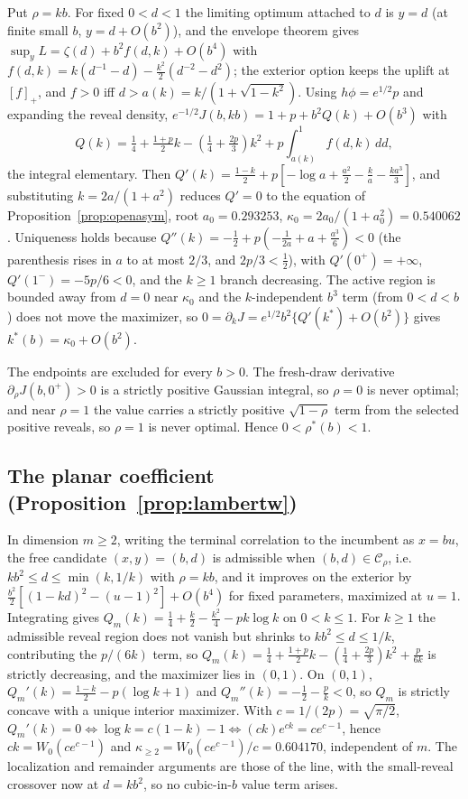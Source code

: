 \documentclass[11pt]{article}
\theoremstyle{itheads}
\begin{document}
Put $\rho=kb$. For fixed $0<d<1$ the limiting optimum attached to $d$
is $y=d$ (at finite small $b$, $y=d+O(b^{2})$), and the envelope theorem
gives
$\sup_y L=\zeta(d)+b^{2}f(d,k)+O(b^{4})$ with
$f(d,k)=k(d^{-1}-d)-\tfrac{k^{2}}{2}(d^{-2}-d^{2})$; the exterior option
keeps the uplift at $[f]_+$, and $f>0$ iff $d>a(k)=k/(1+\sqrt{1-k^{2}})$.
Using $h\phi=e^{1/2}p$ and expanding the reveal density,
$e^{-1/2}J(b,kb)=1+p+b^{2}Q(k)+O(b^{3})$ with
\begin{equation}
Q(k)=\tfrac14+\tfrac{1+p}{2}k-\left(\tfrac14+\tfrac{2p}{3}\right)k^{2}
+p\!\int_{a(k)}^{1}\!f(d,k)\,dd,
\end{equation}
the integral elementary. Then
$Q'(k)=\tfrac{1-k}{2}+p[-\log a+\tfrac{a^{2}}{2}-\tfrac{k}{a}
-\tfrac{ka^{3}}{3}]$, and substituting $k=2a/(1+a^{2})$ reduces $Q'=0$
to the equation of Proposition~\ref{prop:openasym}, root
$a_0=0.293253$, $\kappa_0=2a_0/(1+a_0^{2})=0.540062$. Uniqueness holds
because $Q''(k)=-\tfrac12+p(-\tfrac1{2a}+a+\tfrac{a^{3}}{6})<0$ (the
parenthesis rises in $a$ to at most $2/3$, and $2p/3<\tfrac12$), with
$Q'(0^{+})=+\infty$, $Q'(1^{-})=-5p/6<0$, and the $k\ge1$ branch
decreasing. The active region is bounded away from $d=0$ near
$\kappa_0$ and the $k$-independent $b^{3}$ term (from $0<d<b$) does not
move the maximizer, so $0=\partial_k J=e^{1/2}b^{2}\{Q'(k^{*})+O(b^{2})\}$
gives $k^{*}(b)=\kappa_0+O(b^{2})$.

The endpoints are excluded for every $b>0$. The fresh-draw derivative
$\partial_\rho J(b,0^{+})>0$ is a strictly positive Gaussian integral,
so $\rho=0$ is never optimal; and near $\rho=1$ the value carries a
strictly positive $\sqrt{1-\rho}$ term from the selected positive
reveals, so $\rho=1$ is never optimal. Hence $0<\rho^{*}(b)<1$.

\subsection*{The planar coefficient (Proposition~\ref{prop:lambertw})}

In dimension $m\ge2$, writing the terminal correlation to the incumbent
as $x=bu$, the free candidate $(x,y)=(b,d)$ is admissible when
$(b,d)\in\mathcal{C}_\rho$, i.e.\ $kb^{2}\le d\le\min(k,1/k)$ with
$\rho=kb$, and it improves on the exterior by
$\tfrac{b^{2}}{2}[(1-kd)^{2}-(u-1)^{2}]+O(b^{4})$ for fixed parameters,
maximized at $u=1$. Integrating
gives $Q_m(k)=\tfrac14+\tfrac{k}{2}-\tfrac{k^{2}}{4}-pk\log k$ on
$0<k\le1$. For $k\ge1$ the admissible reveal region does not vanish but
shrinks to $kb^{2}\le d\le1/k$, contributing the $p/(6k)$ term, so
$Q_m(k)=\tfrac14+\tfrac{1+p}{2}k-(\tfrac14+\tfrac{2p}{3})k^{2}+\tfrac{p}{6k}$
is strictly decreasing, and the maximizer lies in $(0,1)$. On
$(0,1)$, $Q_m'(k)=\tfrac{1-k}{2}-p(\log k+1)$ and
$Q_m''(k)=-\tfrac12-\tfrac{p}{k}<0$, so $Q_m$ is strictly concave with a
unique interior maximizer. With $c=1/(2p)=\sqrt{\pi/2}$,
$Q_m'(k)=0\iff\log k=c(1-k)-1\iff(ck)e^{ck}=ce^{c-1}$, hence
$ck=W_0(ce^{c-1})$ and $\kappa_{\ge2}=W_0(ce^{c-1})/c=0.604170$,
independent of $m$. The localization and remainder arguments are those
of the line, with the small-reveal crossover now at $d=kb^{2}$, so no
cubic-in-$b$ value term arises.
\end{document}
